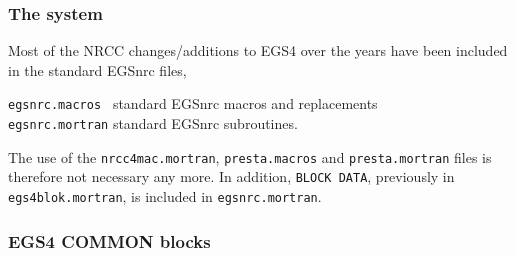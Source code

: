 \subsubsection{The system}

Most of the NRCC changes/additions to EGS4 over the years have been included
in the standard EGSnrc files,
\begin{flushleft}
{\tt egsnrc.macros~} \quad \quad standard EGSnrc macros and replacements\\
{\tt egsnrc.mortran} \quad \quad standard EGSnrc subroutines.
\end{flushleft}
The use of the {\tt nrcc4mac.mortran},
{\tt presta.macros} and {\tt presta.mortran} files is therefore
not necessary any more. In addition, {\tt BLOCK DATA},
previously in {\tt egs4blok.mortran}, is included in {\tt egsnrc.mortran}.

\subsubsection{EGS4 COMMON blocks}

